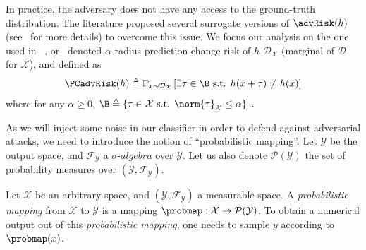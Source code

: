 In practice, the adversary does not have any access to the ground-truth distribution.
The literature proposed several surrogate versions of $\advRisk(h)$ (see~\cite{diochnos2018adversarial} for more details) to overcome this issue.
We focus our analysis on the one used in \eg~\cite{szegedy2013intriguing}, or~\cite{fawzi2018adversarial} denoted $\alpha$-radius prediction-change risk of $h$ \wrt $\mathcal{D}_{\mathcal{X}}$ (marginal of $\mathcal{D}$ for $\mathcal{X}$), and defined as   
\begin{align}
    \PCadvRisk(h) \triangleq \mathbb{P}_{x\sim \mathcal{D}_{\mathcal{X}}}\left[\exists \tau \in \B \text{ s.t. } h(x+\tau)\neq h(x) \right]
\end{align}
where for any $\alpha \geq 0$, \quad $\B \triangleq \{\tau \in \mathcal{X} \text{ s.t. } \norm{\tau}_{\mathcal{X}} \leq \alpha\}\enspace.$

As we will inject some noise in our classifier in order to defend against adversarial attacks, we need to introduce the notion of ``probabilistic mapping''. Let $\mathcal{Y}$ be the output space, and $\mathcal{F}_{\mathcal{Y}}$ a $\sigma$-$ algebra$ over $\mathcal{Y}$. Let us also denote $\mathcal{P}(\mathcal{Y})$ the set of probability measures over $(\mathcal{Y},\mathcal{F}_{\mathcal{Y}})$.

\begin{definition} Let $\mathcal{X}$ be an arbitrary space, and $(\mathcal{Y},\mathcal{F}_{\mathcal{Y}})$ a measurable space. A \emph{probabilistic mapping} from $\mathcal{X}$ to $\mathcal{Y}$ is a mapping $\probmap: \mathcal{X} \to \mathcal{P}(\mathcal{Y})$.
To obtain a numerical output out of this \emph{probabilistic mapping}, one needs to sample $y$ according to $\probmap(x)$. %
\end{definition} 

